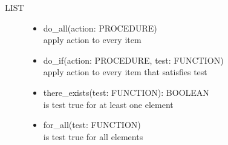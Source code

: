 \documentclass[11pt]{article}
\begin{document}
\begin{description}
	\item[LIST]
	\begin{itemize}
		\item do\_all(action: PROCEDURE) \\ apply action to every item
		\item do\_if(action: PROCEDURE, test: FUNCTION) \\ apply action to every item that satisfies test
		\item there\_exists(test: FUNCTION): BOOLEAN \\ is test true for at least one element
		\item for\_all(test: FUNCTION) \\ is test true for all elements
	\end{itemize}
\end{description}
\end{document}
